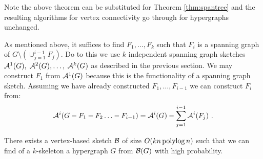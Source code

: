 Note the above theorem can be substituted for Theorem \ref{thm:spantree} and the resulting algorithms for vertex connectivity go through for hypergraphs unchanged. 
%

%

 
As mentioned above, it suffices to find $F_1, \ldots, F_k$ such that $F_i$ is a spanning graph of $G\setminus   (\cup_{j=1}^{i-1} F_{j} )$. 
Do to this we use  $k$ independent spanning graph sketches ${\cal A}^1(G), $ $ {\cal A}^2(G), \ldots, $ $ {\cal A}^k(G)$ as described in the previous section. We may construct $F_1$ from ${\cal A}^1(G)$ because this is the functionality of a spanning graph sketch. Assuming we have already constructed $F_1, \ldots, F_{i-1}$ we can construct $F_i$ from:
\[
{\cal A}^i(G-F_1-F_2\ldots - F_{i-1})={\cal A}^i(G)-\sum_{j=1}^{i-1} {\cal A}^i(F_j) \ .
\]


\begin{theorem}
There exists a vertex-based sketch ${\cal B}$ of size $O(kn\operatorname{polylog} n)$ such that we can  find of a $k$-skeleton  a hypergraph $G$ from ${\cal B}(G)$ with high probability.
\end{theorem}

